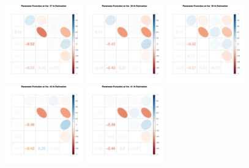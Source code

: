 \begin{figure}[h]
\centering
\includegraphics[width=0.3\textwidth,height=0.2\textheight]{Chapters/05MCMCOU/plots/paraEvolution/corMatrix37.pdf}
\includegraphics[width=0.3\textwidth,height=0.2\textheight]{Chapters/05MCMCOU/plots/paraEvolution/corMatrix38.pdf}
\includegraphics[width=0.3\textwidth,height=0.2\textheight]{Chapters/05MCMCOU/plots/paraEvolution/corMatrix39.pdf}
\includegraphics[width=0.3\textwidth,height=0.2\textheight]{Chapters/05MCMCOU/plots/paraEvolution/corMatrix40.pdf}
\includegraphics[width=0.3\textwidth,height=0.2\textheight]{Chapters/05MCMCOU/plots/paraEvolution/corMatrix41.pdf}

\end{figure}
